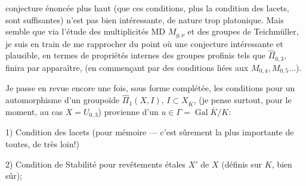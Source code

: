 conjecture énoncée plus haut (que ces conditions, plus la condition des lacets,  sont suffisantes) n'est pas bien intéressante, de nature trop platonique. Mais    semble que via l'étude des multiplicités MD $M_{g,\nu}$ et des groupes de Teichmüller, je suis en train de me rapprocher du point où une conjecture intéressante et plausible, en termes de propriétés internes des groupes profinis tels que $\widehat{\Pi}_{0,3}$, finira par apparaître, (en commençant par des conditions liées aux $M_{0,4},M_{0,5}\ldots$).

Je passe en revue encore une fois, sous forme complétée, les conditions pour un automorphisme \inserted{$\Theta$} d'un groupoïde $\widehat{\Pi}_1(X,I)$, $I\subset X_{\overline{K}}$,  (je pense surtout, pour le moment, au cas $X=U_{0,3}$) provienne d'un $u\in\Gamma=\operatorname{Gal}\overline{K}/K$:

1) Condition des lacets (pour mémoire --- c'est sûrement la plus importante de toutes, de très loin!)

2) Condition de Stabilité pour revêtements étales  $X'$ de $X$ (définis sur $K$, bien sûr);
